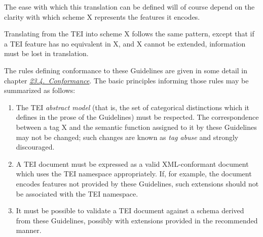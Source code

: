 The ease with which this translation can be defined will of course depend on the clarity with which scheme X represents the features it encodes.\par
Translating from the TEI into scheme X follows the same pattern, except that if a TEI feature has no equivalent in X, and X cannot be extended, information must be lost in translation.\par
The rules defining conformance to these Guidelines are given in some detail in chapter \textit{\hyperref[CF]{23.4.\ Conformance}}. The basic principles informing those rules may be summarized as follows: \begin{enumerate}
\item The TEI \textit{abstract model} (that is, the set of categorical distinctions which it defines in the prose of the Guidelines) must be respected. The correspondence between a tag X and the semantic function assigned to it by these Guidelines may not be changed; such changes are known as \textit{tag abuse} and strongly discouraged.
\item A TEI document must be expressed as a valid XML-conformant document which uses the TEI namespace appropriately. If, for example, the document encodes features not provided by these Guidelines, such extensions should not be associated with the TEI namespace. 
\item It must be possible to validate a TEI document against a schema derived from these Guidelines, possibly with extensions provided in the recommended manner.
\end{enumerate}
